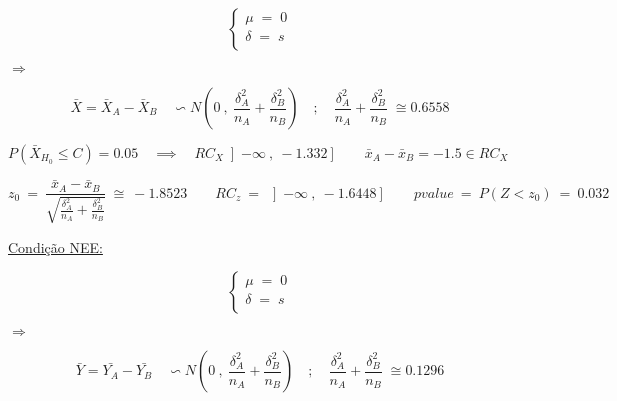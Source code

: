 \newline
\begin{minipage}[l]{0pt}
	$$\left\lbrace\begin{array}{c}
		\mu \;=\; 0 \\
		\delta \;=\; s \\
	\end{array}\right.$$
\end{minipage}
\hspace{3cm} $\Longrightarrow$ \hspace{1cm}
\begin{minipage}[l]{0pt}
	\[\bar{X}=\bar{X}_A-\bar{X}_B \quad \backsim N \left( 0\:,\: \frac{\delta_A^2}{n_A}+\frac{\delta_B^2}{n_B} \right) \quad ; \quad \frac{\delta_A^2}{n_A}+\frac{\delta_B^2}{n_B}\;\cong0.6558 \]
\end{minipage}
\newline
\vspace{1cm}
\newline
$P(\bar{X}_{H_0} \leqslant C)=0.05 \quad \implies \quad RC_X\left] -\infty \:,\: -1.332 \right] \qquad \bar{x}_A-\bar{x}_B=-1.5 \in RC_X $
\newline
\vspace{1cm}
\newline
\begin{minipage}[l]{0pt}
	\[  z_0\:=\: \frac{\bar{x}_A-\bar{x}_B}{\sqrt{\frac{\delta_A^2}{n_A}+\frac{\delta_B^2}{n_B}}}\:\cong\: -1.8523 \qquad
	RC_z \:=\: \left] -\infty \:,\: -1.6448 \right]  \qquad
	pvalue \:=\: P(Z<z_0) \:=\: 0.032 \]
\end{minipage}
\newline
\vspace{1cm}
\newline
\hspace*{5cm} \underline{Condição NEE:}\\
\begin{minipage}[l]{0pt}
	$$\left\lbrace\begin{array}{c}
		\mu \;=\; 0 \\
		\delta \;=\; s \\
	\end{array}\right.$$
\end{minipage}
\hspace{3cm} $\Longrightarrow$ \hspace{1cm}
\begin{minipage}[l]{0pt}
	\[ \bar{Y}=\bar{Y_A}-\bar{Y_B} \quad \backsim N \left( 0\:,\: \frac{\delta_A^2}{n_A}+\frac{\delta_B^2}{n_B} \right) \quad ; \quad \frac{\delta_A^2}{n_A}+\frac{\delta_B^2}{n_B} \; \cong 0.1296 \]
\end{minipage}
